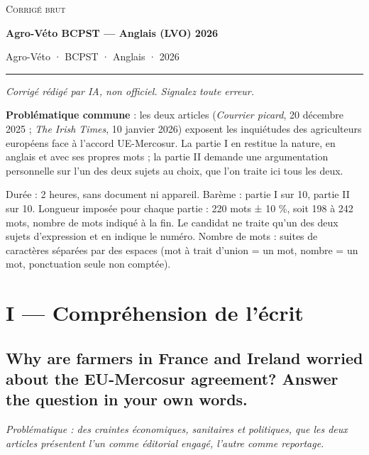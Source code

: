 \documentclass[11pt,a4paper]{article}
\begin{document}
\thispagestyle{plain}
\begin{center}
  {\small\scshape Corrigé brut}\par\smallskip
  {\LARGE\bfseries Agro-Véto BCPST — Anglais (LVO) 2026\par}\medskip
  {\large Agro-Véto · BCPST · Anglais · 2026\par}
\end{center}
\vspace{2pt}\hrule\vspace{8pt}

\emph{Corrigé rédigé par IA, non officiel. Signalez toute erreur.}

\textbf{Problématique commune} : les deux articles (\emph{Courrier picard}, 20 décembre 2025 ; \emph{The Irish Times}, 10 janvier 2026) exposent les inquiétudes des agriculteurs européens face à l'accord UE-Mercosur. La partie I en restitue la nature, en anglais et avec ses propres mots ; la partie II demande une argumentation personnelle sur l'un des deux sujets au choix, que l'on traite ici tous les deux.

Durée : 2 heures, sans document ni appareil. Barème : partie I sur 10, partie II sur 10. Longueur imposée pour chaque partie : 220 mots ± 10 \%, soit 198 à 242 mots, nombre de mots indiqué à la fin. Le candidat ne traite qu'un des deux sujets d'expression et en indique le numéro. Nombre de mots : suites de caractères séparées par des espaces (mot à trait d'union = un mot, nombre = un mot, ponctuation seule non comptée).

\hypertarget{i-compruxe9hension-de-luxe9crit}{%
\section{I --- Compréhension de l'écrit}\label{i-compruxe9hension-de-luxe9crit}}

\hypertarget{why-are-farmers-in-france-and-ireland-worried-about-the-eu-mercosur-agreement-answer-the-question-in-your-own-words.}{%
\subsection{Why are farmers in France and Ireland worried about the EU-Mercosur agreement? Answer the question in your own words.}\label{why-are-farmers-in-france-and-ireland-worried-about-the-eu-mercosur-agreement-answer-the-question-in-your-own-words.}}

\emph{Problématique : des craintes économiques, sanitaires et politiques, que les deux articles présentent l'un comme éditorial engagé, l'autre comme reportage.}
\end{document}

